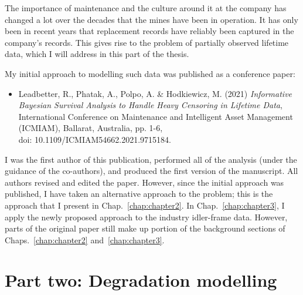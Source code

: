\documentclass[apa,colorlinks,emptypage]{curtinThesis}
\begin{document}
The importance of maintenance and the culture around it at the company has changed a lot over the decades that the mines have been in operation. It has only been in recent years that replacement records have reliably been captured in the company's records. This gives rise to the problem of partially observed lifetime data, which I will address in this part of the thesis.

My initial approach to modelling such data was published as a conference paper:
\begin{itemize}
  \item Leadbetter, R., Phatak, A., Polpo, A. \& Hodkiewicz, M. (2021) \textit{Informative Bayesian Survival Analysis to Handle Heavy Censoring in Lifetime Data}, International Conference on Maintenance and Intelligent Asset Management (ICMIAM), Ballarat, Australia, pp. 1-6,\\ doi: 10.1109/ICMIAM54662.2021.9715184.
\end{itemize}
I was the first author of this publication, performed all of the analysis (under the guidance of the co-authors), and produced the first version of the manuscript. All authors revised and edited the paper. However, since the initial approach was published, I have taken an alternative approach to the problem; this is the approach that I present in Chap.~\ref{chap:chapter2}. In Chap.~\ref{chap:chapter3}, I apply the newly proposed approach to the industry idler-frame data. However, parts of the original paper still make up portion of the background sections of Chaps.~\ref{chap:chapter2} and~\ref{chap:chapter3}.




\part{Part two: Degradation modelling}\label{part:two}
\end{document}
